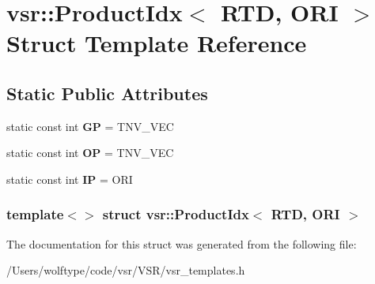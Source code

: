 \hypertarget{structvsr_1_1_product_idx_3_01_r_t_d_00_01_o_r_i_01_4}{\section{vsr\-:\-:Product\-Idx$<$ R\-T\-D, O\-R\-I $>$ Struct Template Reference}
\label{structvsr_1_1_product_idx_3_01_r_t_d_00_01_o_r_i_01_4}
}
\subsection*{Static Public Attributes}
\begin{DoxyCompactItemize}
\item 
\hypertarget{structvsr_1_1_product_idx_3_01_r_t_d_00_01_o_r_i_01_4_a21110fb35ba95f0982ff21962860a4dd}{static const int {\bfseries G\-P} = T\-N\-V\-\_\-\-V\-E\-C}\label{structvsr_1_1_product_idx_3_01_r_t_d_00_01_o_r_i_01_4_a21110fb35ba95f0982ff21962860a4dd}

\item 
\hypertarget{structvsr_1_1_product_idx_3_01_r_t_d_00_01_o_r_i_01_4_aaafdd0cc9251b6f52f9481c751f7e74e}{static const int {\bfseries O\-P} = T\-N\-V\-\_\-\-V\-E\-C}\label{structvsr_1_1_product_idx_3_01_r_t_d_00_01_o_r_i_01_4_aaafdd0cc9251b6f52f9481c751f7e74e}

\item 
\hypertarget{structvsr_1_1_product_idx_3_01_r_t_d_00_01_o_r_i_01_4_a61a90e9475acd16ec893950b784b2942}{static const int {\bfseries I\-P} = O\-R\-I}\label{structvsr_1_1_product_idx_3_01_r_t_d_00_01_o_r_i_01_4_a61a90e9475acd16ec893950b784b2942}

\end{DoxyCompactItemize}
\subsubsection*{template$<$$>$ struct vsr\-::\-Product\-Idx$<$ R\-T\-D, O\-R\-I $>$}



The documentation for this struct was generated from the following file\-:\begin{DoxyCompactItemize}
\item 
/\-Users/wolftype/code/vsr/\-V\-S\-R/vsr\-\_\-templates.\-h\end{DoxyCompactItemize}

